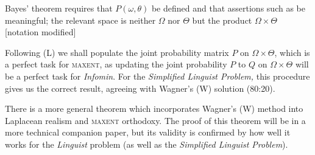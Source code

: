 \documentclass[11pt]{article}
\begin{document}

\begin{quotex}
  Bayes' theorem requires that $P(\omega,\theta)$ be defined and that
  assertions such as  be
  meaningful; the relevant space is neither $\Omega$ nor $\Theta$ but
  the product $\Omega\times\Theta$ [notation modified]
\end{quotex}

Following (L) we shall populate the joint probability matrix $P$ on
$\Omega\times\Theta$, which is a perfect task for \textsc{maxent}, as
updating the joint probability $P$ to $Q$ on $\Omega\times\Theta$ will
be a perfect task for \emph{Infomin}. For the \emph{Simplified
  Linguist Problem,} this procedure gives us the correct result,
agreeing with Wagner's (W) solution (80:20). 

There is a more general theorem which incorporates Wagner's (W) method
into Laplacean realism and \textsc{maxent} orthodoxy. The proof of
this theorem will be in a more technical companion paper, but its
validity is confirmed by how well it works for the \emph{Linguist}
problem (as well as the \emph{Simplified Linguist Problem}).
\end{document}
